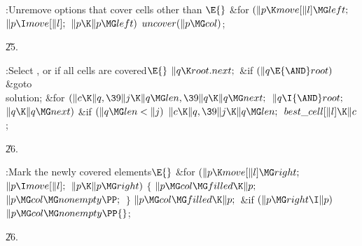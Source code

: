\B{}:Unremove options that cover cells other than \X${}\E{}$\6
\&{for} ${}(\|p\K\\{move}[\|l]\MG\\{left};{}$ ${}\|p\I\\{move}[\|l];{}$ ${}\|p%
\K\|p\MG\\{left}){}$\1\5
${}\\{uncover}(\|p\MG\\{col}){}$;\2\par
\U25.\fi

\B{}:Select , or  if all cells are covered\X${}\E{}$\6
$\|q\K\\{root}.\\{next};{}$\6
\&{if} ${}(\|q\E{\AND}\\{root}){}$\1\5
\&{goto} \\{solution};\2\6
\&{for} ${}(\|c\K\|q,\39\|j\K\|q\MG\\{len},\39\|q\K\|q\MG\\{next};{}$ ${}\|q\I{%
\AND}\\{root};{}$ ${}\|q\K\|q\MG\\{next}){}$\1\6
\&{if} ${}(\|q\MG\\{len}<\|j){}$\1\5
${}\|c\K\|q,\39\|j\K\|q\MG\\{len};{}$\2\2\6
${}\\{best\_cell}[\|l]\K\|c{}$;\par
\U26.\fi

\B{}:Mark the newly covered elements\X${}\E{}$\6
\&{for} ${}(\|p\K\\{move}[\|l]\MG\\{right};{}$ ${}\|p\I\\{move}[\|l];{}$ ${}\|p%
\K\|p\MG\\{right}){}$\5
${}\{{}$\1\6
${}\|p\MG\\{col}\MG\\{filled}\K\|p;{}$\6
${}\|p\MG\\{col}\MG\\{nonempty}\PP;{}$\6
\4${}\}{}$\2\6
${}\|p\MG\\{col}\MG\\{filled}\K\|p;{}$\6
\&{if} ${}(\|p\MG\\{right}\I\|p){}$\1\5
${}\|p\MG\\{col}\MG\\{nonempty}\PP{}$;\2\par
\U26.\fi

